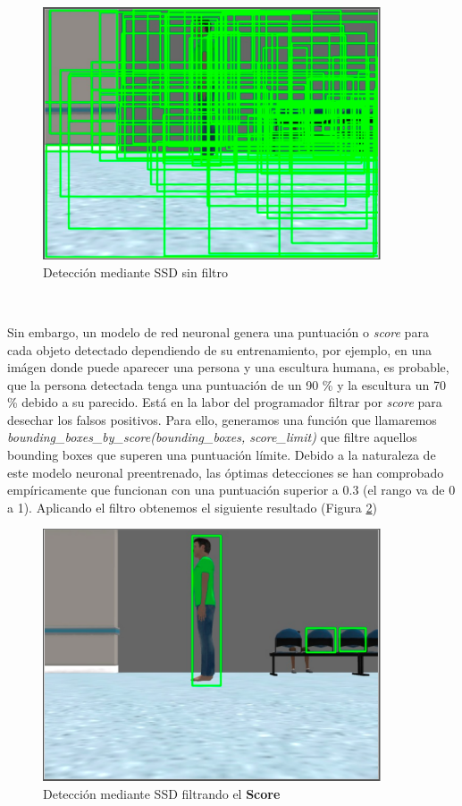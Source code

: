 \begin{figure} [H]
  \begin{center}
    \includegraphics[width=10cm]{imagenes/cap6/deteccion-ssd-sin-filtro.png}
  \end{center}
  \caption[Detección mediante SSD sin filtro]{Detección mediante SSD sin filtro}
  \label{fig:deteccion_ssd_sin_filtro}
\end{figure}\

Sin embargo, un modelo de red neuronal genera una puntuación o \textit{score} para cada objeto detectado dependiendo de su entrenamiento, por ejemplo, en una imágen donde puede aparecer una persona y una escultura humana, es probable, que la persona detectada tenga una puntuación de un 90 \% y la escultura un 70 \% debido a su parecido. Está en la labor del programador filtrar por \textit{score} para desechar los falsos positivos. Para ello, generamos una función que llamaremos \textit{bounding\_boxes\_by\_score(bounding\_boxes, score\_limit)} que filtre aquellos bounding boxes que superen una puntuación límite. Debido a la naturaleza de este modelo neuronal preentrenado, las óptimas detecciones se han comprobado empíricamente que funcionan con una puntuación superior a 0.3 (el rango va de 0 a 1). Aplicando el filtro obtenemos el siguiente resultado (Figura \ref{fig:deteccion_ssd_filtro_score})\\

\begin{figure} [H]
  \begin{center}
    \includegraphics[width=10cm]{imagenes/cap6/deteccion-ssd-filtro-score.png}
  \end{center}
  \caption[Detección mediante SSD filtrando el \textbf{Score}]{Detección mediante SSD filtrando el \textbf{Score}}
  \label{fig:deteccion_ssd_filtro_score}
\end{figure}\

